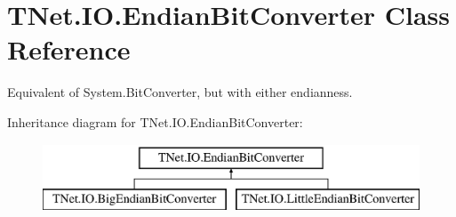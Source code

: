 \hypertarget{class_t_net_1_1_i_o_1_1_endian_bit_converter}{}\section{T\+Net.\+I\+O.\+Endian\+Bit\+Converter Class Reference}
\label{class_t_net_1_1_i_o_1_1_endian_bit_converter}


Equivalent of System.\+Bit\+Converter, but with either endianness.  


Inheritance diagram for T\+Net.\+I\+O.\+Endian\+Bit\+Converter\+:\begin{figure}[H]
\begin{center}
\leavevmode
\includegraphics[height=2.000000cm]{class_t_net_1_1_i_o_1_1_endian_bit_converter}
\end{center}
\end{figure}
